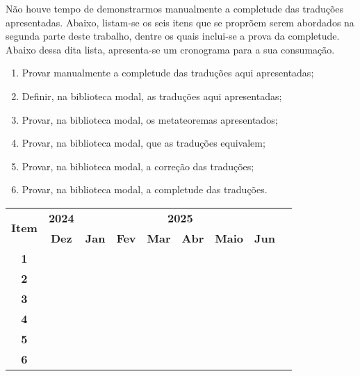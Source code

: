         Não houve tempo de demonstrarmos manualmente a completude das traduções apresentadas. Abaixo, listam-se os seis itens que se proprõem serem abordados na segunda parte deste trabalho, dentre os quais inclui-se a prova da completude. Abaixo dessa dita lista, apresenta-se um cronograma para a sua consumação.

        \begin{enumerate}
            \item Provar manualmente a completude  das traduções aqui apresentadas;
            \item Definir, na biblioteca modal, as traduções aqui apresentadas;
            \item Provar, na biblioteca modal, os metateoremas apresentados;
            \item Provar, na biblioteca modal, que as traduções equivalem;
            \item Provar, na biblioteca modal, a correção das traduções;
            \item Provar, na biblioteca modal, a completude das traduções.
        \end{enumerate}

        \setcounter{table}{1}

        \begin{table*}[htbp]
            \centering
            \begin{tabular}{|c|c|c|c|c|c|c|c|c|}
              \hline
              \multirow{2}{*}{\textbf{\small{Item}}} & \textbf{\small{2024}} & \multicolumn{6}{c|}{\textbf{\small{2025}}} \\
              \cline{2-8}
              & \textbf{Dez} & \textbf{Jan} & \textbf{Fev} & \textbf{Mar} & \textbf{Abr} & \textbf{Maio} & \textbf{Jun} \\
              \hline
              \textbf{\small{1}}  & \cellcolor{gray} & \cellcolor{gray} &  &  &  &  & \\
              \hline
              \textbf{\small{2}}  &  & \cellcolor{gray} &  &  &  &  & \\
              \hline
              \textbf{\small{3}}  &  & \cellcolor{gray} & \cellcolor{gray} & \cellcolor{gray} & &  & \\
              \hline
              \textbf{\small{4}}  &  &  & \cellcolor{gray} & \cellcolor{gray} & \cellcolor{gray} &  & \\
              \hline
              \textbf{\small{5}}  &  &  &  & \cellcolor{gray} & \cellcolor{gray} & \cellcolor{gray} & \\
              \hline
              \textbf{\small{6}}  &  &  &  &  & \cellcolor{gray} & \cellcolor{gray} & \cellcolor{gray}\\
              \hline
            \end{tabular}
          \end{table*}

    
    

